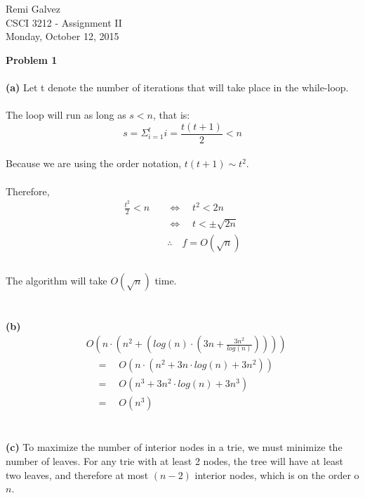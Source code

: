 \documentclass{article}
\begin{document}
	\begin{flushright}
		Remi Galvez \\
		CSCI 3212 - Assignment II \\
		Monday, October 12, 2015 \\
	\end{flushright}
	
	\noindent \textbf{Problem 1}\\
	\\
	\textbf{(a)} Let t denote the number of iterations that will take place in the while-loop.\\
	\\
	The loop will run as long as $s < n$, that is:
	$$s = \Sigma_{i=1}^t i = \frac{t(t+1)}{2} < n$$
	\\
	Because we are using the order notation, $t(t+1) \sim t^2$.\\
	\\
	Therefore, \\
	\begin{align*}
		\frac{t^2}{2} < n & \quad \Longleftrightarrow \quad t^2 < 2n\\
		& \quad \Longleftrightarrow \quad t < \pm \sqrt{2n}\\
		& \quad \therefore \quad f = O(\sqrt{n})\\
	\end{align*}
	\\
	The algorithm will take $O(\sqrt{n})$ time.\\
	\\
	\\
	\textbf{(b)}
	\begin{align*}
		& O\left(n \cdot \left(n^2 + \left(log\left(n\right) \cdot \left(3n + \frac{3n^2}{log\left(n\right)}\right)\right)\right)\right) \\
		& \quad = \quad O\left(n \cdot \left( n^2 + 3n \cdot log\left(n\right) + 3n^2 \right) \right) \\
		& \quad= \quad O\left(n^3 + 3n^2 \cdot log\left(n\right) + 3n^3 \right)\\
		& \quad = \quad O\left(n^3\right)
	\end{align*}
	\\
	\\
	\textbf{(c)} To maximize the number of interior nodes in a trie, we must minimize the number of leaves. For any trie with at least 2 nodes, the tree will have at least two leaves, and therefore at most $(n-2)$ interior nodes, which is on the order o $n$.\\
	\\
\end{document}
